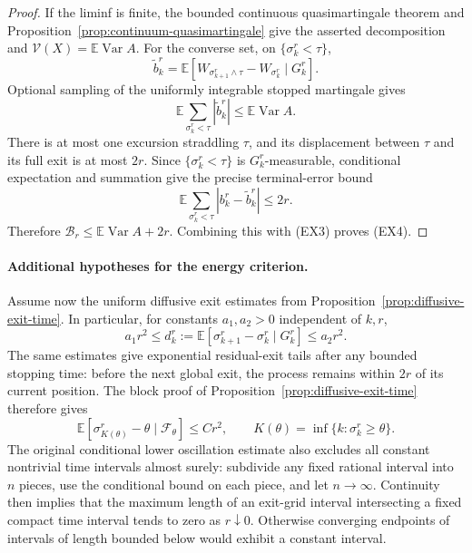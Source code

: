 \documentclass[11pt]{article}
\theoremstyle{definition}\newtheorem{definition}[theorem]{Definition}
\theoremstyle{remark}\newtheorem{remark}[theorem]{Remark}
\begin{document}
\begin{proof}
If the liminf is finite, the bounded continuous quasimartingale theorem
and Proposition~\ref{prop:continuum-quasimartingale} give the asserted
decomposition and $\mathcal V(X)=\mathbb E\operatorname{Var}A$.
For the converse set, on $\{\sigma^r_k<\tau\}$,
\[
 \widetilde b^r_k=
 \mathbb E[W_{\sigma^r_{k+1}\wedge\tau}-W_{\sigma^r_k}
                        \mid G^r_k].
\]
Optional sampling of the uniformly integrable stopped martingale gives
\[
 \mathbb E\sum_{\sigma^r_k<\tau}|\widetilde b^r_k|
       \le\mathbb E\operatorname{Var}A.
\]
There is at most one excursion straddling $\tau$, and its displacement
between $\tau$ and its full exit is at most $2r$. Since
$\{\sigma^r_k<\tau\}$ is $G^r_k$-measurable, conditional expectation
and summation give the precise terminal-error bound
\[
 \mathbb E\sum_{\sigma^r_k<\tau}|b^r_k-\widetilde b^r_k|\le2r.
 \tag{EX6}
\]
Therefore $\mathcal B_r\le\mathbb E\operatorname{Var}A+2r$.
Combining this with (EX3) proves (EX4).
\end{proof}

\paragraph{Additional hypotheses for the energy criterion.}
Assume now the uniform diffusive exit estimates from
Proposition~\ref{prop:diffusive-exit-time}. In particular, for constants
$a_1,a_2>0$ independent of $k,r$,
\[
 a_1r^2\le d^r_k:={\mathbb E}[\sigma^r_{k+1}-\sigma^r_k
                                     \mid G^r_k]\le a_2r^2.
 \tag{EX7}
\]
The same estimates give exponential residual-exit tails after any bounded
stopping time: before the next global exit, the process remains within
$2r$ of its current position. The block proof of
Proposition~\ref{prop:diffusive-exit-time} therefore gives
\[
 \mathbb E[\sigma^r_{K(\theta)}-\theta\mid\mathcal F_\theta]
       \le C r^2,\qquad
 K(\theta)=\inf\{k:\sigma^r_k\ge\theta\}.
 \tag{EX8}
\]
The original conditional lower oscillation estimate also excludes all
constant nontrivial time intervals almost surely: subdivide any fixed
rational interval into $n$ pieces, use the conditional bound on each
piece, and let $n\to\infty$. Continuity then implies that the maximum
length of an exit-grid interval intersecting a fixed compact time
interval tends to zero as $r\downarrow0$. Otherwise converging endpoints
of intervals of length bounded below would exhibit a constant interval.
\end{document}
